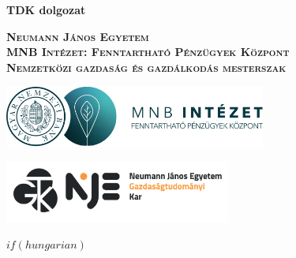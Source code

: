\begin{frontmatter}
\begin{titlepage}
\clearpage
\thispagestyle{empty}

\vspace*{2cm}
\begin{center}
    {\bfseries\fontsize{28}{22}\selectfont TDK dolgozat}
    \vspace*{\fill}
\end{center}

\begin{center}
    \vspace*{\fill}
    {\bfseries\fontsize{24}{20}\selectfont \the\year{}}
\end{center}
\vspace*{3cm}
\end{titlepage}

\newpage

\begin{titlepage}
\clearpage
\thispagestyle{empty}
\vspace*{0.1cm}
\begin{center}
    
    {\bfseries\fontsize{16}{22}\selectfont \textsc{Neumann János Egyetem}} \\ {\bfseries\fontsize{16}{22}\selectfont \textsc{MNB Intézet: Fenntartható Pénzügyek Központ }} \\ {\bfseries\fontsize{16}{22}\selectfont \textsc{Nemzetközi gazdaság és gazdálkodás mesterszak}}
\end{center}
\vspace*{1cm}
\begin{center}
   \includegraphics[height=0.8in]{_extensions/mnb_logo.png}

\end{center}
\vspace*{1cm}
\begin{center}
   \includegraphics[height=0.8in]{_extensions/neumann.png}

\end{center}
$if(hungarian)$
\vspace*{1cm}
\begin{center}
    

\end{center}
\end{titlepage}
\end{frontmatter}
